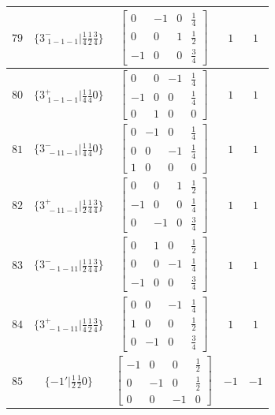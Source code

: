 \documentclass[fleqn,8pt]{jsarticle}
\begin{document}
\begin{longtable}{ccccc}
$ 79 $ & $ \{3^{-}_{\,\,1-1-1}|\frac{1}{4} \frac{1}{2} \frac{3}{4}\} $ & $ \begin{bmatrix} 0 & -1 & 0 & \frac{1}{4} \\ 0 & 0 & 1 & \frac{1}{2} \\ -1 & 0 & 0 & \frac{3}{4} \end{bmatrix} $ & $ 1 $ & $ 1 $ \\ \hline
$ 80 $ & $ \{3^{+}_{\,\,1-1-1}|\frac{1}{4} \frac{1}{4} 0\} $ & $ \begin{bmatrix} 0 & 0 & -1 & \frac{1}{4} \\ -1 & 0 & 0 & \frac{1}{4} \\ 0 & 1 & 0 & 0 \end{bmatrix} $ & $ 1 $ & $ 1 $ \\ \hline
$ 81 $ & $ \{3^{-}_{\,\,-11-1}|\frac{1}{4} \frac{1}{4} 0\} $ & $ \begin{bmatrix} 0 & -1 & 0 & \frac{1}{4} \\ 0 & 0 & -1 & \frac{1}{4} \\ 1 & 0 & 0 & 0 \end{bmatrix} $ & $ 1 $ & $ 1 $ \\ \hline
$ 82 $ & $ \{3^{+}_{\,\,-11-1}|\frac{1}{2} \frac{1}{4} \frac{3}{4}\} $ & $ \begin{bmatrix} 0 & 0 & 1 & \frac{1}{2} \\ -1 & 0 & 0 & \frac{1}{4} \\ 0 & -1 & 0 & \frac{3}{4} \end{bmatrix} $ & $ 1 $ & $ 1 $ \\ \hline
$ 83 $ & $ \{3^{-}_{\,\,-1-11}|\frac{1}{2} \frac{1}{4} \frac{3}{4}\} $ & $ \begin{bmatrix} 0 & 1 & 0 & \frac{1}{2} \\ 0 & 0 & -1 & \frac{1}{4} \\ -1 & 0 & 0 & \frac{3}{4} \end{bmatrix} $ & $ 1 $ & $ 1 $ \\ \hline
$ 84 $ & $ \{3^{+}_{\,\,-1-11}|\frac{1}{4} \frac{1}{2} \frac{3}{4}\} $ & $ \begin{bmatrix} 0 & 0 & -1 & \frac{1}{4} \\ 1 & 0 & 0 & \frac{1}{2} \\ 0 & -1 & 0 & \frac{3}{4} \end{bmatrix} $ & $ 1 $ & $ 1 $ \\ \hline
$ 85 $ & $ \{-1{}'|\frac{1}{2} \frac{1}{2} 0\} $ & $ \begin{bmatrix} -1 & 0 & 0 & \frac{1}{2} \\ 0 & -1 & 0 & \frac{1}{2} \\ 0 & 0 & -1 & 0 \end{bmatrix} $ & $ -1 $ & $ -1 $ \\ \hline

\end{longtable}
\end{document}
